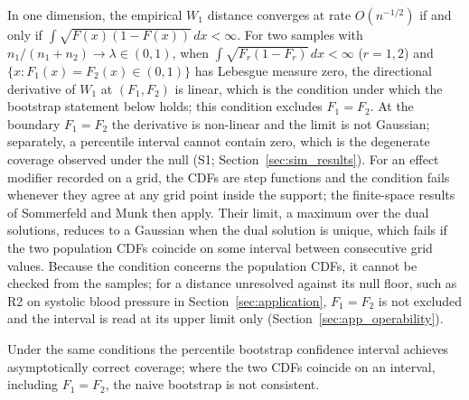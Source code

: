 \documentclass[AMA,Times1COL]{WileyNJDv5}
\begin{document}
In one dimension, the empirical $W_1$ distance converges at rate $O(n^{-1/2})$ if and only if $\int \sqrt{F(x)(1-F(x))}\,dx < \infty$.\cite{delbarrio1999} For two samples with $n_1/(n_1+n_2) \to \lambda \in (0,1)$, when $\int \sqrt{F_r(1-F_r)}\,dx < \infty$ ($r = 1, 2$) and $\{x : F_1(x) = F_2(x) \in (0,1)\}$ has Lebesgue measure zero, the directional derivative of $W_1$ at $(F_1, F_2)$ is linear, which is the condition under which the bootstrap statement below holds;\cite{fang2019} this condition excludes $F_1 = F_2$. At the boundary $F_1 = F_2$ the derivative is non-linear and the limit is not Gaussian; separately, a percentile interval cannot contain zero, which is the degenerate coverage observed under the null (S1; Section~\ref{sec:sim_results}). For an effect modifier recorded on a grid, the CDFs are step functions and the condition fails whenever they agree at any grid point inside the support; the finite-space results of Sommerfeld and Munk then apply.\cite{sommerfeld2018} Their limit, a maximum over the dual solutions, reduces to a Gaussian when the dual solution is unique, which fails if the two population CDFs coincide on some interval between consecutive grid values. Because the condition concerns the population CDFs, it cannot be checked from the samples; for a distance unresolved against its null floor, such as R2 on systolic blood pressure in Section~\ref{sec:application}, $F_1 = F_2$ is not excluded and the interval is read at its upper limit only (Section~\ref{sec:app_operability}).

Under the same conditions the percentile bootstrap confidence interval achieves asymptotically correct coverage;\cite{fang2019} where the two CDFs coincide on an interval, including $F_1 = F_2$, the naive bootstrap is not consistent.\cite{dumbgen1993,fang2019}
\end{document}
